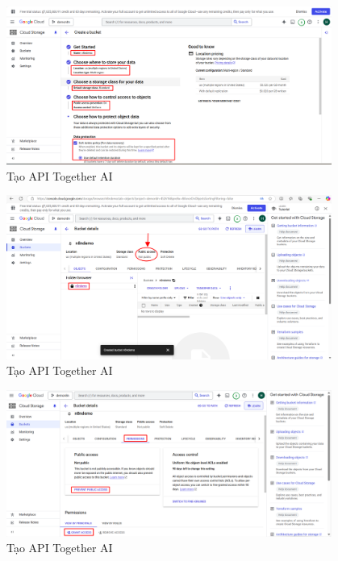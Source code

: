 \begin{itemize}[label=]
\begin{figure}[H]
    \end{figure}
    \begin{figure}[H]
    \centering
    \includegraphics[width=0.95\textwidth]{images/GGcloud-6.png}
    \caption{Tạo API Together AI}
    
    \end{figure}
    \begin{figure}[H]
    \centering
    \includegraphics[width=0.95\textwidth]{images/GGcloud-7.png}
    \caption{Tạo API Together AI}
    
    \end{figure}
    \begin{figure}[H]
    \centering
    \includegraphics[width=0.95\textwidth]{images/GGcloud-8.png}
    \caption{Tạo API Together AI}
    

\end{figure}
\end{itemize}
